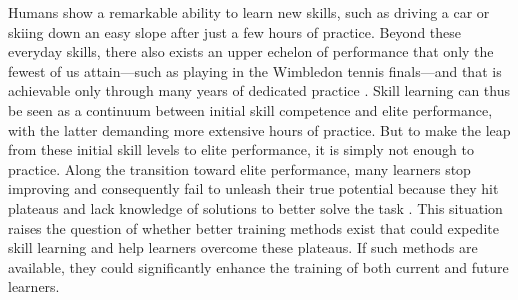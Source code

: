 
Humans show a remarkable ability to learn new skills, such as driving a car or skiing down an easy slope after just a few hours of practice. Beyond these everyday skills, there also exists an upper echelon of performance that only the fewest of us attain—such as playing in the Wimbledon tennis finals—and that is achievable only through many years of dedicated practice \cite{hodges_predicting_2004, ericsson_role_1993, vaeyens_talent_2009}. Skill learning can thus be seen as a continuum between initial skill competence and elite performance, with the latter demanding more extensive hours of practice. But to make the leap from these initial skill levels to elite performance, it is simply not enough to practice. Along the transition toward elite performance, many learners stop improving and consequently fail to unleash their true potential because they hit plateaus and lack knowledge of solutions to better solve the task \cite{thorndike_educational_1913, grayloooooong,grayshort,ericsson_scientific_1998, ericsson_development_2003}. This situation raises the question of whether better training methods exist that could expedite skill learning and help learners overcome these plateaus. If such methods are available, they could significantly enhance the training of both current and future learners. 








